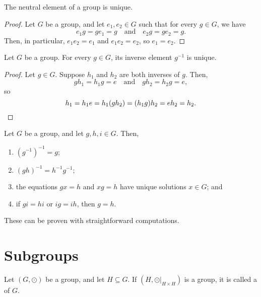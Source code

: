 \begin{prop}
The neutral element of a group is unique.
\end{prop}
\begin{proof}
Let $ G $ be a group, and let $ e_1,e_2\in G $ such that for every $ g\in G $, we have
\begin{equation*}
    e_1g=ge_1=g \quad\text{and}\quad e_2g=ge_2=g.
\end{equation*}
Then, in particular, $ e_1e_2=e_1 $ and $ e_1e_2=e_2 $, so $ e_1=e_2 $.
\end{proof}

\begin{prop}
Let $ G $ be a group. For every $ g\in G $, its inverse element $ g^{-1} $ is unique.
\end{prop}
\begin{proof}
Let $ g\in G $. Suppose $ h_1 $ and $ h_2 $ are both inverses of $ g $. Then,
\begin{equation*}
    gh_1=h_1g=e \quad\text{and}\quad gh_2=h_2g=e,
\end{equation*}
so
\begin{equation*}
    h_1=h_1e=h_1(gh_2)=(h_1g)h_2=eh_2=h_2.\qedhere
\end{equation*}
\end{proof}

\begin{prop}\label{prop:group_elems}
Let $ G $ be a group, and let $ g,h,i\in G $. Then,
\begin{enumerate}
    \item $ (g^{-1})^{-1}=g $;
    \item $ (gh)^{-1}=h^{-1}g^{-1} $;
    \item the equations $ gx=h $ and $ xg=h $ have unique solutions $ x\in G $; and
    \item if $ gi=hi $ or $ ig=ih $, then $ g=h $.
\end{enumerate}
\end{prop}

These can be proven with straightforward computations.

\section{Subgroups}

\begin{defn}
Let $ (G,\odot) $ be a group, and let $ H\subseteq G $. If $ (H,\odot\rvert_{H\times H}) $ is a group, it is called a  of $ G $.
\end{defn}

